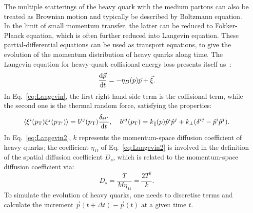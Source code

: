 The multiple scatterings of the heavy quark with the medium 
partons can also be treated as Brownian motion and typically
be described by Boltzmann equation. In the limit of small 
momentum transfer, the latter can be reduced to 
Fokker-Planck equation, which is often further reduced into 
Langevin equation. These
partial-differential equations can be used as transport equations, 
to give the evolution of the momentum distribution
of heavy quarks along time. The Langevin equation for heavy-quark 
collisional energy loss presents itself as~\cite{Cao:2013ita}:
\begin{equation}
\label{eq:Langevin}
\frac{{\rm d} {\vec{p}}}{{\rm d} t} = - \eta_D (p) \vec{p} + \vec{\xi}.
\end{equation}
In Eq.~\ref{eq:Langevin}, the first right-hand side term is the 
collisional term, while the second one is the thermal random force,
satisfying the properties:
\begin{equation}
\label{eq:Langevin2}
\langle {\xi^i (p_{\rm T})} {\xi^j (p_{\rm T'})} \rangle = b^{ij} (p_{\rm T}) \frac{\delta_{tt'}}{{\rm d} t}, \; \; \; \; b^{ij} (p_{\rm T}) = k_{\parallel}(p)\hat{p}^i\hat{p}^j + k_{\perp} (\delta^{ij} - \hat{p}^i\hat{p}^j).
\end{equation}
In Eq.~\ref{eq:Langevin2}, $k$ represents the momentum-space 
diffusion coefficient of heavy quarks;
the coefficient $\eta_D$ of Eq.~\ref{eq:Langevin2} is involved in the definition of the spatial 
diffusion coefficient $D_s$, which is related to the momentum-space 
diffusion coefficient via: 
\begin{equation}
\label{eq:Langevin3}
D_s = \frac{T}{M \eta_D} = \frac{2 T^2}{k}.
\end{equation}
To simulate the evolution of heavy quarks, one needs to discretise terms and calculate the increment 
$\vec{p}(t + \Delta t) -  \vec{p}(t)$ at a given time $t$. 

